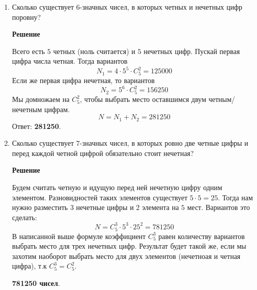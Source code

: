 \documentclass[12pt]{article}
\begin{document}
\begin{enumerate}[label={\textbf{\arabic{section}.\arabic*}}]
		\item Сколько существует $6$-значных чисел, в которых четных и нечетных цифр поровну?
		
		\textbf{Решение}
		
		Всего есть $5$ четных (ноль считается) и $5$ нечетных цифр. Пускай первая цифра числа четная. Тогда вариантов
		$$
		N_1 = 4\cdot5^5\cdot C_5^2 = 125000
		$$
		Если же первая цифра нечетная, то вариантов
		$$
		N_2 = 5^6\cdot C_5^2 = 156250
		$$
		Мы домножаем на $C_5^2$, чтобы выбрать место оставшимся двум четным/нечетным цифрам.
		$$
		N = N_1 + N_2 = 281250
		$$
		Ответ: \textbf{281250}.
		
		\item Сколько существует $7$-значных чисел, в которых ровно две четные цифры и перед каждой четной цифрой обязательно стоит нечетная?
		
		\textbf{Решение}
		
		Будем считать четную и идущую перед ней нечетную цифру одним элементом. Разновидностей таких элементов существует $5\cdot5 = 25$. Тогда нам нужно разместить $3$ нечетные цифры и $2$ элемента на $5$ мест. Вариантов это сделать:
		$$
		N = C_5^3\cdot5^3\cdot25^2 = 781250
		$$
		В написанной выше формуле коэффициент $C_5^3$ равен количеству вариантов выбрать место для трех нечетных цифр. Результат будет такой же, если мы захотим наоборот выбрать место для двух элементов (нечетноая и четная цифра), т.к $C_5^3 = C_5^2$.
		
		\textbf{781250 чисел}.
	\end{enumerate}
	\newpage
\end{document}
